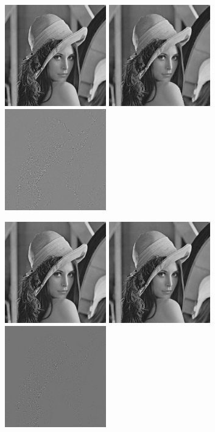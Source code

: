 \documentclass{article}
\begin{document}
\includegraphics[width=0.33\textwidth]{../data/lenna.jpg}
\includegraphics[width=0.33\textwidth]{../data/threshold_4_lenna.jpg}
\includegraphics[width=0.33\textwidth]{../data/delta_threshold_4_lenna.jpg}

\includegraphics[width=0.33\textwidth]{../data/lenna.jpg}
\includegraphics[width=0.33\textwidth]{../data/threshold_8_lenna.jpg}
\includegraphics[width=0.33\textwidth]{../data/delta_threshold_8_lenna.jpg}
\end{document}
